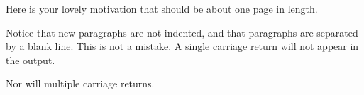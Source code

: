 Here is your lovely motivation that should be about one page in length.

Notice that new paragraphs are not indented, and that paragraphs are separated by a blank line. This is not a mistake.
A single carriage return will not appear in the output.

Nor will multiple carriage returns.
